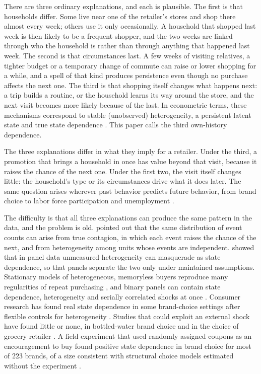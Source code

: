 \documentclass[11pt]{article}
\begin{document}
There are three ordinary explanations, and each is plausible. The first is that households
differ. Some live near one of the retailer's stores and shop there almost every week; others use it
only occasionally. A household that shopped last week is then likely to be a frequent shopper,
and the two weeks are linked through who the household is rather than through anything
that happened last week. The second is that circumstances last. A few weeks of visiting
relatives, a tighter budget or a temporary change of commute can raise or lower shopping for
a while, and a spell of that kind produces persistence even though no purchase affects the
next one. The third is that shopping itself changes what happens next: a trip builds a
routine, or the household learns its way around the store, and the next visit becomes more
likely because of the last. In econometric terms, these mechanisms correspond to stable
(unobserved) heterogeneity, a persistent latent state and true state dependence
\citep{heckman1981}. This paper calls the third own-history dependence.

The three explanations differ in what they imply for a retailer. Under the third, a promotion
that brings a household in once has value beyond that visit, because it raises the chance of
the next one. Under the first two, the visit itself changes little: the household's type or
its circumstances drive what it does later. The same question arises wherever
past behavior predicts future behavior, from brand choice \citep{keane1997} to labor force
participation \citep{hyslop1999} and unemployment \citep{torgovitsky2019}.

The difficulty is that all three explanations can produce the same pattern in the data, and
the problem is old. \citet{feller1943} pointed out that the same distribution of event counts can
arise from true contagion, in which each event raises the chance of the next, and from
heterogeneity among units whose events are independent. \citet{heckman1981} showed that in
panel data unmeasured heterogeneity can masquerade as state dependence, so that panels
separate the two only under maintained assumptions.
Stationary models of heterogeneous, memoryless buyers reproduce many regularities of repeat
purchasing \citep{goodhardt1984}, and binary panels can contain state dependence,
heterogeneity and serially correlated shocks at once \citep{hyslop1999}. Consumer research
has found real state dependence in some brand-choice settings after flexible controls for
heterogeneity \citep{keane1997,dube_hitsch_rossi}. Studies that could exploit an external
shock have found little or none, in bottled-water brand choice \citep{levine_seiler} and in
the choice of grocery retailer \citep{kotschedoff2025}. A field experiment that used randomly
assigned coupons as an encouragement to buy found positive state dependence in brand choice for
most of 223 brands, of a size consistent with structural choice models estimated without the
experiment \citep{gabel2026}.
\end{document}
